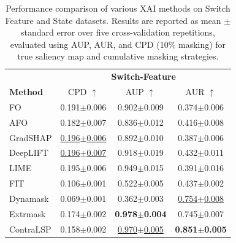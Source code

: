 \documentclass[11pt]{article}
\theoremstyle{plain}
\theoremstyle{definition}
\theoremstyle{remark}
\begin{document}
\begin{table}[h!]
\centering
\caption{
Performance comparison of various XAI methods on Switch Feature and State datasets. Results are reported as mean \( \pm \) standard error over five cross-validation repetitions, evaluated using AUP, AUR, and CPD (10\% masking) for true saliency map and cumulative masking strategies.
}
\label{tab:synthetic_results}
\setlength{\tabcolsep}{8pt}
\begin{tabular}{l|ccc}
    \toprule
    {} 
    & \multicolumn{3}{c}{\textbf{Switch-Feature}}  \\
    \textbf{Method} &
    CPD $\uparrow$ & AUP $\uparrow$ & AUR $\uparrow$ \\
    \midrule
    FO        & 0.191\scriptsize{$\pm$0.006} & 0.902\scriptsize{$\pm$0.009} & 0.374\scriptsize{$\pm$0.006} \\
    
    AFO       & 0.182\scriptsize{$\pm$0.007} & 0.836\scriptsize{$\pm$0.012} & 0.416\scriptsize{$\pm$0.008} \\
    
    GradSHAP  & \underline{0.196\scriptsize{$\pm$0.006}} & 0.892\scriptsize{$\pm$0.010} & 0.387\scriptsize{$\pm$0.006} \\
    
    DeepLIFT  & \underline{0.196\scriptsize{$\pm$0.007}} & 0.918\scriptsize{$\pm$0.019} & 0.432\scriptsize{$\pm$0.011} \\
    
    LIME      & 0.195\scriptsize{$\pm$0.006} & 0.949\scriptsize{$\pm$0.015} & 0.391\scriptsize{$\pm$0.016} \\
    
    FIT       & 0.106\scriptsize{$\pm$0.001} & 0.522\scriptsize{$\pm$0.005} & 0.437\scriptsize{$\pm$0.002} \\
    
    Dynamask  & 0.069\scriptsize{$\pm$0.001} & 0.362\scriptsize{$\pm$0.003} & \underline{0.754\scriptsize{$\pm$0.008}}  \\
    
    Extrmask  & 0.174\scriptsize{$\pm$0.002} & \textbf{0.978\scriptsize{$\pm$0.004}} & 0.745\scriptsize{$\pm$0.007}  \\
    
    ContraLSP & 0.158\scriptsize{$\pm$0.002} & \underline{0.970\scriptsize{$\pm$0.005}} & \textbf{0.851\scriptsize{$\pm$0.005}}  \\
    

\end{tabular}
\end{table}
\end{document}
